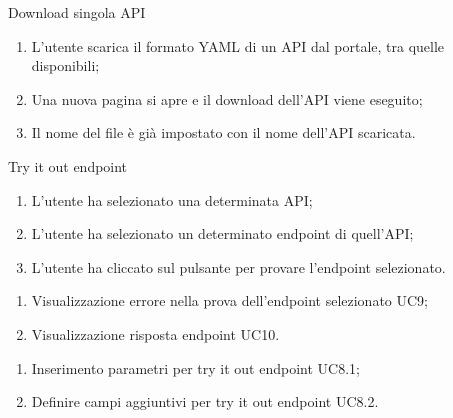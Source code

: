 \begin{usecase}{7}{Download singola API}\label{uc:download-singola-api}

    \usecasemain{}
        \begin{enumerate}
            \item L'utente scarica il formato YAML di un API dal portale, tra quelle disponibili;
            \item Una nuova pagina si apre e il download dell'API viene eseguito;
            \item Il nome del file è già impostato con il nome dell'API scaricata.
        \end{enumerate}

\end{usecase}


\begin{usecase}{8}{Try it out endpoint}\label{uc:try-it-out-endpoint}
    \clearpage
    \usecasemain{}
        \begin{enumerate}
            \item L'utente ha selezionato una determinata API;
            \item L'utente ha selezionato un determinato endpoint di quell'API;
            \item L'utente ha cliccato sul pulsante per provare l'endpoint selezionato.
        \end{enumerate}

    \usecaseext{}
        \begin{enumerate}
            \item Visualizzazione errore nella prova dell'endpoint selezionato UC9;
            \item Visualizzazione risposta endpoint UC10.
        \end{enumerate}

        \begin{enumerate}
            \item Inserimento parametri per try it out endpoint UC8.1;
            \item Definire campi aggiuntivi per try it out endpoint UC8.2.
        \end{enumerate}

\end{usecase}

